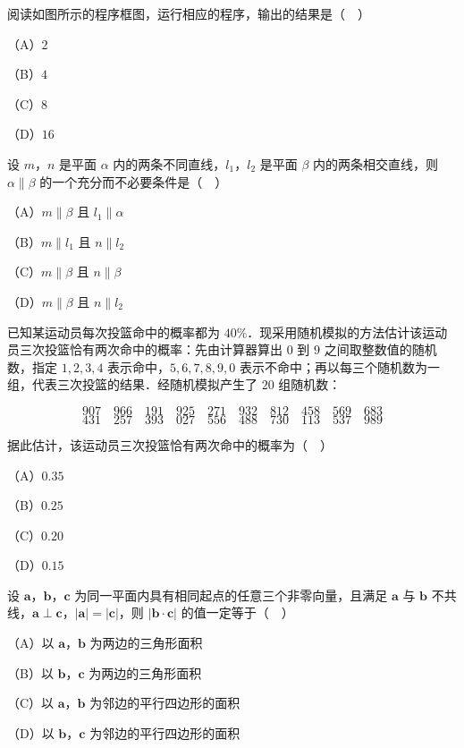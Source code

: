 \begingroup
\renewenvironment{question}{\Needspace{0.5\textheight}}{}
\begin{question}
阅读如图所示的程序框图，运行相应的程序，输出的结果是（　）
\nopagebreak[4]
\begin{center}\end{center}
\nopagebreak[4]
（A）$2$

（B）$4$

（C）$8$

（D）$16$

\end{question}
\endgroup
\begin{question}
设 $m$，$n$ 是平面 $\alpha$ 内的两条不同直线，$l_1$，$l_2$ 是平面 $\beta$ 内的两条相交直线，则 $\alpha\parallel\beta$ 的一个充分而不必要条件是（　）

（A）$m\parallel\beta$ 且 $l_1\parallel\alpha$

（B）$m\parallel l_1$ 且 $n\parallel l_2$

（C）$m\parallel\beta$ 且 $n\parallel\beta$

（D）$m\parallel\beta$ 且 $n\parallel l_2$

\end{question}
\begin{question}
已知某运动员每次投篮命中的概率都为 $40\%$．现采用随机模拟的方法估计该运动员三次投篮恰有两次命中的概率：先由计算器算出 $0$ 到 $9$ 之间取整数值的随机数，指定 $1,2,3,4$ 表示命中，$5,6,7,8,9,0$ 表示不命中；再以每三个随机数为一组，代表三次投篮的结果．经随机模拟产生了 $20$ 组随机数：

\nopagebreak[4]
\[907\quad966\quad191\quad925\quad271\quad932\quad812\quad458\quad569\quad683\]
\nopagebreak[4]
\[431\quad257\quad393\quad027\quad556\quad488\quad730\quad113\quad537\quad989\]

据此估计，该运动员三次投篮恰有两次命中的概率为（　）

（A）$0.35$

（B）$0.25$

（C）$0.20$

（D）$0.15$

\end{question}
\begin{question}
设 $\boldsymbol a$，$\boldsymbol b$，$\boldsymbol c$ 为同一平面内具有相同起点的任意三个非零向量，且满足 $\boldsymbol a$ 与 $\boldsymbol b$ 不共线，$\boldsymbol a\perp\boldsymbol c$，$|\boldsymbol a|=|\boldsymbol c|$，则 $|\boldsymbol b\cdot\boldsymbol c|$ 的值一定等于（　）

（A）以 $\boldsymbol a$，$\boldsymbol b$ 为两边的三角形面积

（B）以 $\boldsymbol b$，$\boldsymbol c$ 为两边的三角形面积

（C）以 $\boldsymbol a$，$\boldsymbol b$ 为邻边的平行四边形的面积

（D）以 $\boldsymbol b$，$\boldsymbol c$ 为邻边的平行四边形的面积

\end{question}
